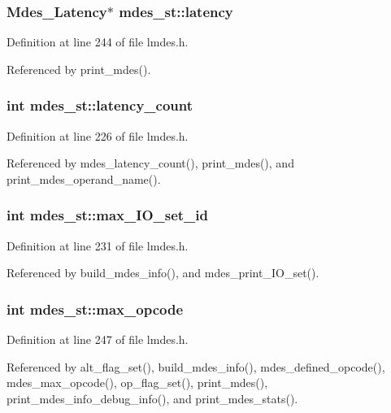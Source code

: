 \subsubsection{\setlength{\rightskip}{0pt plus 5cm}\bf{Mdes\_\-Latency}$\ast$ \bf{mdes\_\-st::latency}}\label{structmdes__st_682d6c434bc4536d925d68070be151d1}




Definition at line 244 of file lmdes.h.

Referenced by print\_\-mdes().
\subsubsection{\setlength{\rightskip}{0pt plus 5cm}int \bf{mdes\_\-st::latency\_\-count}}\label{structmdes__st_af06863442c6f95040820a3cc4f93bbc}




Definition at line 226 of file lmdes.h.

Referenced by mdes\_\-latency\_\-count(), print\_\-mdes(), and print\_\-mdes\_\-operand\_\-name().
\subsubsection{\setlength{\rightskip}{0pt plus 5cm}int \bf{mdes\_\-st::max\_\-IO\_\-set\_\-id}}\label{structmdes__st_75de6777cb4235aa6785356f9dded25c}




Definition at line 231 of file lmdes.h.

Referenced by build\_\-mdes\_\-info(), and mdes\_\-print\_\-IO\_\-set().
\subsubsection{\setlength{\rightskip}{0pt plus 5cm}int \bf{mdes\_\-st::max\_\-opcode}}\label{structmdes__st_f49d24269206355ebdc64103af0ba61f}




Definition at line 247 of file lmdes.h.

Referenced by alt\_\-flag\_\-set(), build\_\-mdes\_\-info(), mdes\_\-defined\_\-opcode(), mdes\_\-max\_\-opcode(), op\_\-flag\_\-set(), print\_\-mdes(), print\_\-mdes\_\-info\_\-debug\_\-info(), and print\_\-mdes\_\-stats().
